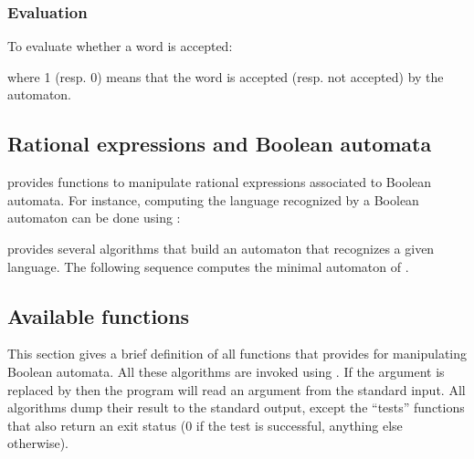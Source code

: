 \subsubsection{Evaluation}

To evaluate whether a word is accepted:


\noindent
where 1 (resp. 0) means that the word is accepted (resp. not accepted)
by the automaton.

\subsection{Rational expressions and Boolean automata}

\Vauc provides functions to manipulate rational expressions associated
to Boolean automata. For instance, computing the language recognized
by a Boolean automaton can be done using :


\Vauc provides several algorithms that build an automaton that
recognizes a given language.  The following sequence computes the
minimal automaton of .

\begin{center}
\end{center}

\subsection{Available functions}
This section gives a brief definition of all functions that \Vauc
provides for manipulating Boolean automata.  All these algorithms are
invoked using . If
the argument is replaced by \samp{-} then the program will read an
argument from the standard input.  All algorithms dump their result to
the standard output, except the ``tests'' functions that also return
an exit status (0 if the test is successful, anything else otherwise).

\smallskip

